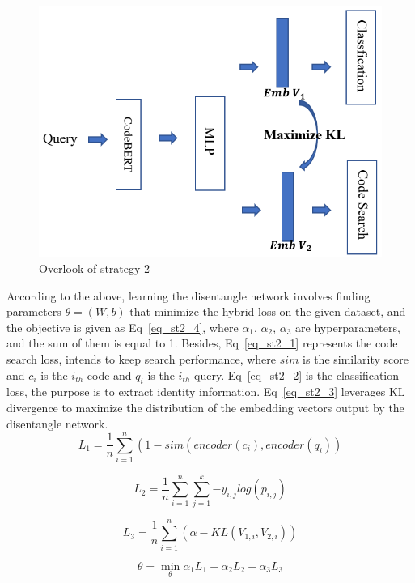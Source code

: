 \begin{figure}[htb]
	\centering
	\includegraphics[width=0.8\linewidth]{imgs/st2.png}
	\caption{Overlook of strategy 2}
	\label{fig:st2}
\end{figure}

According to the above, learning the disentangle network 
involves finding parameters $\theta=(W,b)$ that minimize the hybrid loss on the given dataset, 
and the objective is given as Eq~\ref{eq_st2_4}, 
where $\alpha_1$, $\alpha_2$, $\alpha_3$ are hyperparameters, 
and the sum of them is equal to 1. 
Besides, Eq~\ref{eq_st2_1} represents the code search loss, intends to keep search performance, 
where $sim$ is  the similarity score and $c_i$ is the $i_{th}$ code and $q_i$  is the $i_{th}$ query. 
Eq~\ref{eq_st2_2} is the classification loss, the purpose is to extract identity information. 
Eq~\ref{eq_st2_3} leverages KL divergence to maximize the distribution of the embedding vectors output 
by the disentangle network.
\begin{equation}\label{eq_st2_1}
L_{1} = \frac{1}{n}{\sum_{i = 1}^{n}\left( 1 - sim\left( encoder\left( c_{i} \right),encoder\left( q_{i} \right) \right) \right.}
\end{equation}

\begin{equation}\label{eq_st2_2}
L_{2} = \frac{1}{n}{\sum_{i = 1}^{n}{\sum_{j = 1}^{k}{- y_{i,j}log\left( p_{i,j} \right)}}}
\end{equation}

\begin{equation}\label{eq_st2_3}
L_{3} = \frac{1}{n}{\sum_{i = 1}^{n}\left( \alpha - KL\left( V_{1,i},V_{2,i} \right) \right)}
\end{equation}

\begin{equation}\label{eq_st2_4}
\theta = {\min\limits_{\theta}{\alpha_{1}L_{1} +}}\alpha_{2}L_{2} + \alpha_{3}L_{3}
\end{equation}

